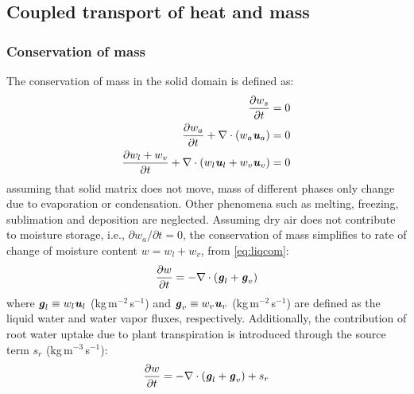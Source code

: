 \subsection{Coupled transport of heat and mass}
\label{subsec:ctoham}
\subsubsection*{Conservation of mass}
The conservation of mass in the solid domain is defined as:
\begin{align}
\frac{\partial w_s}{\partial t} &= 0 \label{eq:solidcom} \\ 
\frac{\partial w_a}{\partial t} + \nabla \cdot \left(w_a\textbf{\textit{u}}_a \right) &= 0 \label{eq:aircom} \\ 
\frac{\partial w_l + w_v}{\partial t} + \nabla \cdot \left(w_l\textbf{\textit{u}}_l + w_v\textbf{\textit{u}}_v \right) &= 0 \label{eq:liqcom}
\end{align}
assuming that solid matrix does not move, mass of different phases only change due to evaporation or condensation. Other phenomena such as melting, freezing, sublimation and deposition are neglected. Assuming dry air does not contribute to moisture storage, i.e., $\partial w_a / \partial t = 0$, the conservation of mass simplifies to rate of change of moisture content $w = w_l + w_v$, from \cref{eq:liqcom}:
\begin{equation}
 \frac{\partial w}{\partial t} = - \nabla \cdot \left(\textbf{\textit{g}}_l + \textbf{\textit{g}}_v \right)
\end{equation}
where $\textbf{\textit{g}}_l \equiv w_l\textbf{\textit{u}}_l$ (kg\,m$^{-2}$\,s$^{-1}$) and $\textbf{\textit{g}}_v \equiv w_v\textbf{\textit{u}}_v$ (kg\,m$^{-2}$\,s$^{-1}$) are defined as the liquid water and water vapor fluxes, respectively. Additionally, the contribution of root water uptake due to plant transpiration is introduced through the source term $s_r$ (kg\,m$^{-3}$\,s$^{-1}$):
\begin{equation}
\frac{\partial w}{\partial t} = - \nabla \cdot \left(\textbf{\textit{g}}_l + \textbf{\textit{g}}_v \right) + s_r
\label{eq:com4}
\end{equation}

